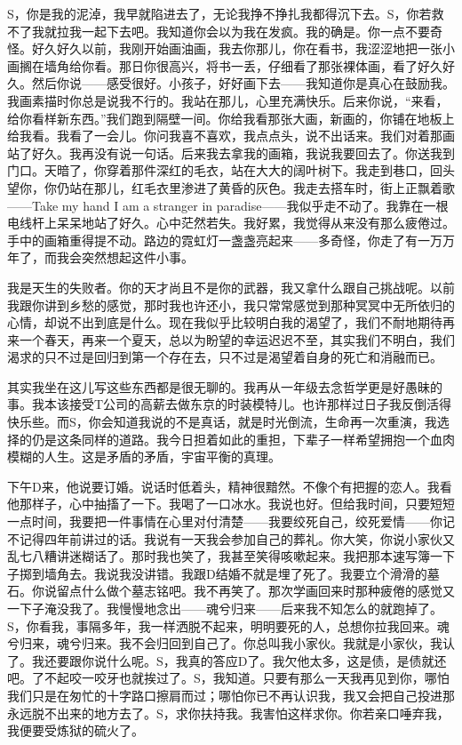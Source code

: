 \par S，你是我的泥淖，我早就陷进去了，无论我挣不挣扎我都得沉下去。S，你若救不了我就拉我一起下去吧。我知道你会以为我在发疯。我的确是。你一点不要奇怪。好久好久以前，我刚开始画油画，我去你那儿，你在看书，我涩涩地把一张小画搁在墙角给你看。那日你很高兴，将书一丢，仔细看了那张裸体画，看了好久好久。然后你说——感受很好。小孩子，好好画下去——我知道你是真心在鼓励我。我画素描时你总是说我不行的。我站在那儿，心里充满快乐。后来你说，“来看，给你看样新东西。”我们跑到隔壁一间。你给我看那张大画，新画的，你铺在地板上给我看。我看了一会儿。你问我喜不喜欢，我点点头，说不出话来。我们对着那画站了好久。我再没有说一句话。后来我去拿我的画箱，我说我要回去了。你送我到门口。天暗了，你穿着那件深红的毛衣，站在大大的阔叶树下。我走到巷口，回头望你，你仍站在那儿，红毛衣里渗进了黄昏的灰色。我走去搭车时，街上正飘着歌——Take my hand I am a stranger in paradise——我似乎走不动了。我靠在一根电线杆上呆呆地站了好久。心中茫然若失。我好累，我觉得从来没有那么疲倦过。手中的画箱重得提不动。路边的霓虹灯一盏盏亮起来——多奇怪，你走了有一万万年了，而我会突然想起这件小事。
\par 我是天生的失败者。你的天才尚且不是你的武器，我又拿什么跟自己挑战呢。以前我跟你讲到乡愁的感觉，那时我也许还小，我只常常感觉到那种冥冥中无所依归的心情，却说不出到底是什么。现在我似乎比较明白我的渴望了，我们不耐地期待再来一个春天，再来一个夏天，总以为盼望的幸运迟迟不至，其实我们不明白，我们渴求的只不过是回归到第一个存在去，只不过是渴望着自身的死亡和消融而已。
\par 其实我坐在这儿写这些东西都是很无聊的。我再从一年级去念哲学更是好愚昧的事。我本该接受T公司的高薪去做东京的时装模特儿。也许那样过日子我反倒活得快乐些。而S，你会知道我说的不是真话，就是时光倒流，生命再一次重演，我选择的仍是这条同样的道路。我今日担着如此的重担，下辈子一样希望拥抱一个血肉模糊的人生。这是矛盾的矛盾，宇宙平衡的真理。
\par 下午D来，他说要订婚。说话时低着头，精神很黯然。不像个有把握的恋人。我看他那样子，心中抽搐了一下。我喝了一口冰水。我说也好。但给我时间，只要短短一点时间，我要把一件事情在心里对付清楚——我要绞死自己，绞死爱情——你记不记得四年前讲过的话。我说有一天我会参加自己的葬礼。你大笑，你说小家伙又乱七八糟讲迷糊话了。那时我也笑了，我甚至笑得咳嗽起来。我把那本速写簿一下子掷到墙角去。我说我没讲错。我跟D结婚不就是埋了死了。我要立个滑滑的墓石。你说留点什么做个墓志铭吧。我不再笑了。那次学画回来时那种疲倦的感觉又一下子淹没我了。我慢慢地念出——魂兮归来——后来我不知怎么的就跑掉了。S，你看我，事隔多年，我一样洒脱不起来，明明要死的人，总想你拉我回来。魂兮归来，魂兮归来。我不会归回到自己了。你总叫我小家伙。我就是小家伙，我认了。我还要跟你说什么呢。S，我真的答应D了。我欠他太多，这是债，是债就还吧。了不起咬一咬牙也就挨过了。S，我知道。只要有那么一天我再见到你，哪怕我们只是在匆忙的十字路口擦肩而过；哪怕你已不再认识我，我又会把自己投进那永远脱不出来的地方去了。S，求你扶持我。我害怕这样求你。你若亲口唾弃我，我便要受炼狱的硫火了。
